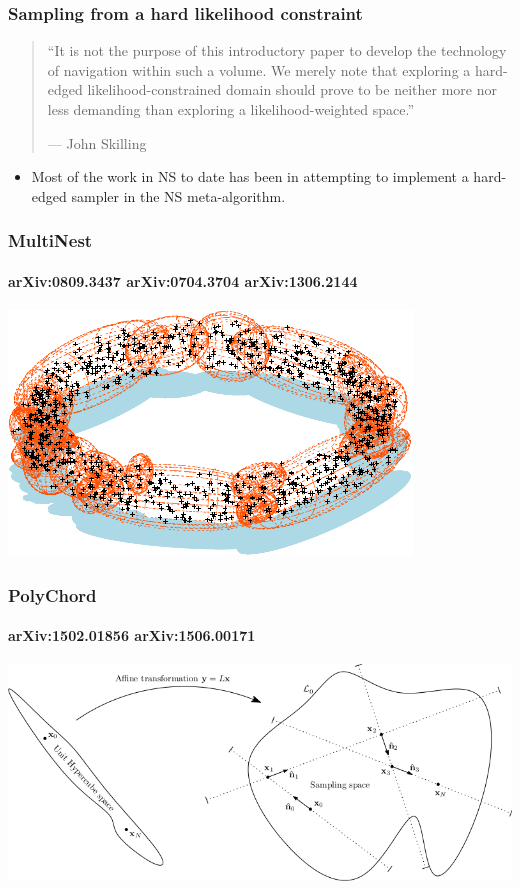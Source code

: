 \documentclass[%
]{beamer}
\begin{document}
\begin{frame}
  \frametitle{Sampling from a hard likelihood constraint} 

  
  \begin{quote}
    ``It is not the purpose of this introductory paper to develop the technology of navigation within such a volume. We merely note that exploring a hard-edged likelihood-constrained domain should prove to be neither more nor less demanding than exploring a likelihood-weighted space.''
    
   {\hfill --- John Skilling}
  \end{quote}

  \begin{itemize}
      
    \item Most of the work in NS to date has been in attempting to implement a hard-edged sampler in the NS meta-algorithm.
  \end{itemize}
 
\end{frame}

\begin{frame}
\frametitle{MultiNest }
  \framesubtitle{arXiv:0809.3437 arXiv:0704.3704 arXiv:1306.2144}
  \includegraphics[width=\textwidth]{figures/multinest.pdf}
\end{frame}

\begin{frame}
  \frametitle{PolyChord}
  \framesubtitle{arXiv:1502.01856 arXiv:1506.00171}
  \includegraphics[width=\textwidth]{figures/polychord.png}
\end{frame}
\end{document}
